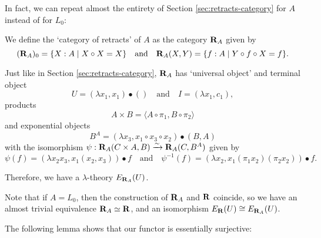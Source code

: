 In fact, we can repeat almost the entirety of Section \ref{sec:retracts-category} for $ A $ instead of for $ L_0 $:
\begin{definition}
  We define the `category of retracts' of $ A $ as the category $ \mathbf{R}_A $ given by
  \[ (\mathbf{R}_A)_0 = \{ X : A \mid X \circ X = X \} \quad \text{and} \quad \mathbf{R}_A(X, Y) = \{ f : A \mid Y \circ f \circ X = f \}. \]
\end{definition}
Just like in Section \ref{sec:retracts-category}, $ \mathbf{R}_A $ has `universal object' and terminal object
\[ U = (\lambda x_1, x_1) \bullet () \quad \text{and} \quad I = (\lambda x_1, c_1), \]
products
\[ A \times B = \langle A \circ \pi_1, B \circ \pi_2 \rangle \]
and exponential objects
\[ B^A = (\lambda x_3, x_1 \circ x_3 \circ x_2) \bullet (B, A) \]
with the isomorphism $ \psi: \mathbf{R}_A(C \times A, B) \xrightarrow \sim \mathbf{R}_A(C, B^A) $
given by
\[ \psi(f) = (\lambda x_2 x_3, x_1 (x_2, x_3)) \bullet f \quad \text{and} \quad \psi^{-1}(f) = (\lambda x_2, x_1 (\pi_1 x_2) (\pi_2 x_2)) \bullet f. \]

Therefore, we have a $ \lambda $-theory $ E_{\mathbf{R}_A}(U) $.

\begin{remark}
  Note that if $ A = L_0 $, then the construction of $ \mathbf{R}_A $ and $ \mathbf{R} $ coincide, so we have an almost trivial equivalence $ \mathbf{R}_A \simeq \mathbf{R} $, and an isomorphism $ E_{\mathbf{R}}(U) \cong E_{\mathbf{R}_A}(U) $.
\end{remark}

The following lemma shows that our functor is essentially surjective:

